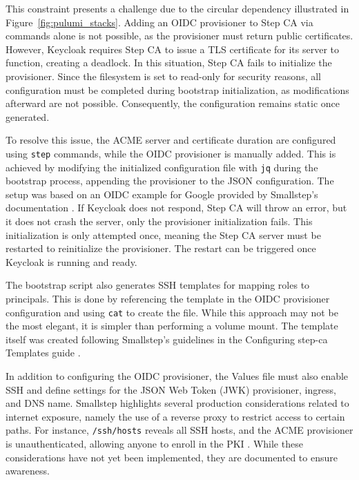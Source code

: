 This constraint presents a challenge due to the circular dependency illustrated in Figure~\ref{fig:pulumi_stacks}. Adding an OIDC provisioner to Step CA via commands alone is not possible, as the provisioner must return public certificates. However, Keycloak requires Step CA to issue a TLS certificate for its server to function, creating a deadlock. In this situation, Step CA fails to initialize the provisioner. Since the filesystem is set to read-only for security reasons, all configuration must be completed during bootstrap initialization, as modifications afterward are not possible. Consequently, the configuration remains static once generated.

To resolve this issue, the ACME server and certificate duration are configured using \texttt{step} commands, while the OIDC provisioner is manually added. This is achieved by modifying the initialized configuration file with \texttt{jq} during the bootstrap process, appending the provisioner to the JSON configuration. The setup was based on an OIDC example for Google provided by Smallstep's documentation \parencite{smallstep_google_identity}. If Keycloak does not respond, Step CA will throw an error, but it does not crash the server, only the provisioner initialization fails. This initialization is only attempted once, meaning the Step CA server must be restarted to reinitialize the provisioner. The restart can be triggered once Keycloak is running and ready.

The bootstrap script also generates SSH templates for mapping roles to principals. This is done by referencing the template in the OIDC provisioner configuration and using \texttt{cat} to create the file. While this approach may not be the most elegant, it is simpler than performing a volume mount. The template itself was created following Smallstep's guidelines in the Configuring step-ca Templates guide \parencite{smallstep_step_ca_templates}.

In addition to configuring the OIDC provisioner, the Values file must also enable SSH and define settings for the JSON Web Token (JWK) provisioner, ingress, and DNS name. Smallstep highlights several production considerations related to internet exposure, namely the use of a reverse proxy to restrict access to certain paths. For instance, \texttt{/ssh/hosts} reveals all SSH hosts, and the ACME provisioner is unauthenticated, allowing anyone to enroll in the PKI \parencite{SmallstepCA}. While these considerations have not yet been implemented, they are documented to ensure awareness.

